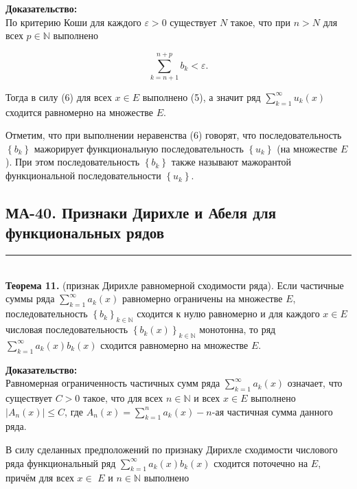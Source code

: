 \documentclass[a4paper,12pt]{article} %
\newcommand{\HRule}{\rule{\linewidth}{0.5mm}}
\begin{document}
	\textbf{Доказательство:\\}
	По критерию Коши для каждого $\varepsilon>0$ существует $N$ такое, что при $n>N$ для всех $p \in \mathbb{N}$ выполнено
	
	$$
	\sum_{k=n+1}^{n+p} b_{k}<\varepsilon .
	$$
	
	Тогда в силу (6) для всех $x \in E$ выполнено (5), а значит ряд $\sum_{k=1}^{\infty} u_{k}(x)$ сходится равномерно на множестве $E$.
	
	Отметим, что при выполнении неравенства (6) говорят, что последовательность $\left\{b_{k}\right\}$ мажорирует функциональную последовательность $\left\{u_{k}\right\}$ (на множестве $E$ ). При этом последовательность $\left\{b_{k}\right\}$ также называют мажорантой функциональной последовательности $\left\{u_{k}\right\}$.
	
	

	\newpage

	\begin{LARGE}
		\begin{center}
			\section{МА-40. Признаки Дирихле и Абеля для функциональных рядов}
		\end{center}
	\end{LARGE}
	\HRule \\


	\textbf{Теорема 11.} (признак Дирихле равномерной сходимости ряда). Если частичные суммы ряда $\sum_{k=1}^{\infty} a_{k}(x)$ равномерно ограничены на множестве $E$, последовательность $\left\{b_{k}\right\}_{k \in \mathbb{N}}$ сходится к нулю равномерно и для каждого $x \in E$ числовая последовательность $\left\{b_{k}(x)\right\}_{k \in \mathbb{N}}$ монотонна, то ряд $\sum_{k=1}^{\infty} a_{k}(x) b_{k}(x)$ сходится равномерно на множестве $E$.
	
	\textbf{Доказательство:\\}
	Равномерная ограниченность частичных сумм ряда $\sum_{k=1}^{\infty} a_{k}(x)$ означает, что существует $C>0$ такое, что для всех $n \in \mathbb{N}$ и всех $x \in E$ выполнено $\left|A_{n}(x)\right| \leq C$, где $A_{n}(x)=\sum_{k=1}^{n} a_{k}(x)-n$-ая частичная сумма данного ряда.
	
	В силу сделанных предположений по признаку Дирихле сходимости числового ряда функциональный ряд $\sum_{k=1}^{\infty} a_{k}(x) b_{k}(x)$ сходится поточечно на $E$, причём для всех $x \in$ $E$ и $n \in \mathbb{N}$ выполнено
	
\end{document}
